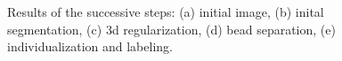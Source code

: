 \documentclass{llncs}
\begin{document}
\begin{figure}
\centering
{}
\vspace{0.3em}
\caption{Results of the successive steps: (a) initial image, (b) inital segmentation, (c) 3d regularization, (d) bead separation, (e) individualization and labeling.}
\label{fig:temporal}
\end{figure}
\end{document}

